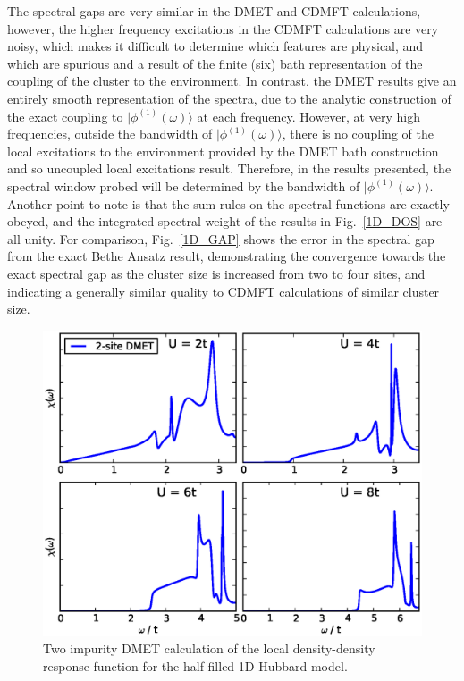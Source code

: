 \documentclass[aps,twocolumn,nobibnotes]{revtex4}
\begin{document}
The spectral gaps are very similar in the DMET and CDMFT calculations, however, the higher frequency excitations in the CDMFT calculations are very noisy, which makes it difficult to determine 
which features are physical, and which are spurious and a result of the finite (six) bath representation of the coupling of the cluster to the environment. In contrast, the DMET results give an entirely smooth
representation of the spectra, due to the analytic construction of the exact coupling to $|\phi^{(1)}(\omega)\rangle$ at each frequency. However, 
at very high frequencies, outside the bandwidth of $|\phi^{(1)}(\omega)\rangle$, there is no coupling of the local excitations to the 
environment provided by the DMET bath construction and so uncoupled local excitations result. 
Therefore, in the results presented, the spectral window probed will be determined by the bandwidth of $|\phi^{(1)}(\omega)\rangle$. Another point to note is that the sum rules on the spectral functions are
exactly obeyed, and the integrated spectral weight of the results in Fig.~\ref{1D_DOS} are all unity.
For comparison, Fig.~\ref{1D_GAP} shows the error in the spectral gap from the exact Bethe Ansatz result\cite{Ovchinni1970}, demonstrating 
the convergence towards the exact spectral gap as the cluster size is increased 
from two to four sites, and indicating a generally similar quality to CDMFT calculations of similar cluster size.

\begin{figure}
\begin{center}
    \vspace{-2mm}
\includegraphics[scale=0.425]{Plots/1D_DD/1D_Hub_DD.eps}
\end{center}
    \vspace{-8mm}
\caption{Two impurity DMET calculation of the local density-density response function for the half-filled 1D Hubbard model.}
\label{1D_DD}
\end{figure}
\end{document}
